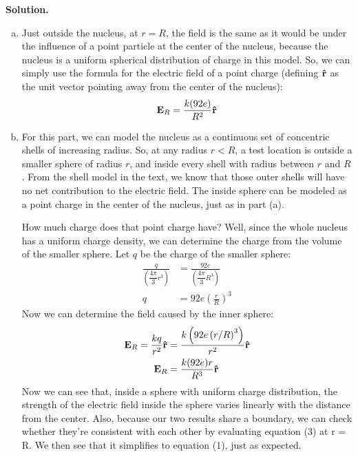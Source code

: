 \documentclass{article}
\begin{document}
\textbf{Solution.}
\begin{enumerate}[(a)]
    \item Just outside the nucleus, at $r = R$, the field is the same as it would be under the influence of a point particle at the center of the nucleus, because the nucleus is a uniform spherical distribution of charge in this model. So, we can simply use the formula for the electric field of a point charge (defining $\vu{r}$ as the unit vector pointing away from the center of the nucleus):
    \begin{equation}
    \vb{E}_R = \frac{k(92e)}{R^2}\vu{r}
    \end{equation}
    
    \item For this part, we can model the nucleus as a continuous set of concentric shells of increasing radius. So, at any radius $r < R$, a test location is outside a smaller sphere of radius $r$, and inside every shell with radius between $r$ and $R$. From the shell model in the text, we know that those outer shells will have no net contribution to the electric field. The inside sphere can be modeled as a point charge in the center of the nucleus, just as in part (a).

    How much charge does that point charge have? Well, since the whole nucleus has a uniform charge density, we can determine the charge from the volume of the smaller sphere. Let $q$ be the charge of the smaller sphere:
    \begin{equation}
    \begin{aligned}
        \frac{q}{\left(\dfrac{4\pi}{3}r^3\right)} &= \frac{92e}{\left(\dfrac{4\pi}{3}R^3\right)} \\
        q &= 92e\left(\frac{r}{R}\right)^3
    \end{aligned}
    \end{equation}
    Now we can determine the field caused by the inner sphere:
    \begin{equation}
    \begin{aligned}
        \vb{E}_R = \frac{kq}{r^2}\vu{r} &= \frac{k\left(92e\left(r/R\right)^3\right)}{r^2}\vu{r} \\
        \vb{E}_R &= \frac{k(92e)r}{R^3}\vu{r}
    \end{aligned}
    \end{equation}
    Now we can see that, inside a sphere with uniform charge distribution, the strength of the electric field inside the sphere varies linearly with the distance from the center. Also, because our two results share a boundary, we can check whether they're consistent with each other by evaluating equation (3) at r = R. We then see that it simplifies to equation (1), just as expected.
\end{enumerate}
\end{document}
